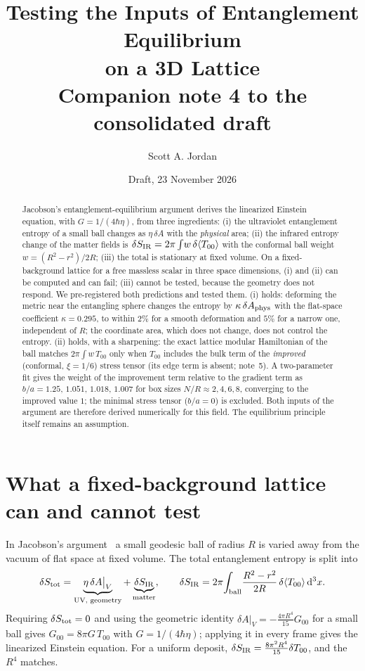 \documentclass[11pt]{article}
\title{Testing the Inputs of Entanglement Equilibrium\\ on a 3D Lattice\\[4pt]
\large Companion note 4 to the consolidated draft}
\author{Scott A. Jordan}
\date{Draft, 23 November 2026}
\newcommand{\dd}{\mathrm{d}}
\begin{document}
\sloppy
\maketitle

\begin{abstract}
Jacobson's entanglement-equilibrium argument derives the linearized Einstein equation, with $G=1/(4\hbar\eta)$, from three ingredients: (i) the ultraviolet entanglement entropy of a small ball changes as $\eta\,\delta A$ with the \emph{physical} area; (ii) the infrared entropy change of the matter fields is $\delta S_{\rm IR}=2\pi\int\! w\,\delta\langle T_{00}\rangle$ with the conformal ball weight $w=(R^2-r^2)/2R$; (iii) the total is stationary at fixed volume. On a fixed-background lattice for a free massless scalar in three space dimensions, (i) and (ii) can be computed and can fail; (iii) cannot be tested, because the geometry does not respond. We pre-registered both predictions and tested them. (i) holds: deforming the metric near the entangling sphere changes the entropy by $\kappa\,\delta A_{\rm phys}$ with the flat-space coefficient $\kappa=0.295$, to within $2\%$ for a smooth deformation and $5\%$ for a narrow one, independent of $R$; the coordinate area, which does not change, does not control the entropy. (ii) holds, with a sharpening: the exact lattice modular Hamiltonian of the ball matches $2\pi\int w\,T_{00}$ only when $T_{00}$ includes the bulk term of the \emph{improved} (conformal, $\xi=1/6$) stress tensor (its edge term is absent; note~5). A two-parameter fit gives the weight of the improvement term relative to the gradient term as $b/a=1.25,\,1.051,\,1.018,\,1.007$ for box sizes $N/R\approx2,4,6,8$, converging to the improved value $1$; the minimal stress tensor ($b/a=0$) is excluded. Both inputs of the argument are therefore derived numerically for this field. The equilibrium principle itself remains an assumption.
\end{abstract}

\section{What a fixed-background lattice can and cannot test}

In Jacobson's argument~\cite{Jacobson2016} a small geodesic ball of radius $R$ is varied away from the vacuum of flat space at fixed volume. The total entanglement entropy is split into
\begin{equation}
\delta S_{\rm tot}=\underbrace{\eta\,\delta A\big|_V}_{\text{UV, geometry}}+\underbrace{\delta S_{\rm IR}}_{\text{matter}},
\qquad \delta S_{\rm IR}=2\pi\!\int_{\rm ball}\! \frac{R^2-r^2}{2R}\,\delta\langle T_{00}\rangle\,\dd^3x .
\label{eq:split}
\end{equation}
Requiring $\delta S_{\rm tot}=0$ and using the geometric identity $\delta A|_V=-\tfrac{4\pi R^4}{15}G_{00}$ for a small ball gives $G_{00}=8\pi G\,T_{00}$ with $G=1/(4\hbar\eta)$; applying it in every frame gives the linearized Einstein equation. For a uniform deposit, $\delta S_{\rm IR}=\tfrac{8\pi^2R^4}{15}\delta T_{00}$, and the $R^4$ matches.
\end{document}
